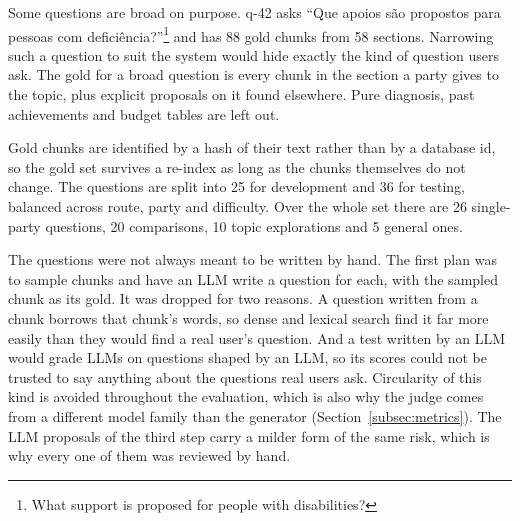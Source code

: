 Some questions are broad on purpose. q-42 asks ``Que apoios são propostos
para pessoas com deficiência?''\footnote{What support is proposed for people
with disabilities?} and has 88 gold chunks from 58 sections. Narrowing such a
question to suit the system would hide exactly the kind of question users ask.
The gold for a broad question is every chunk in the section a party gives to
the topic, plus explicit proposals on it found elsewhere. Pure diagnosis, past
achievements and budget tables are left out.

Gold chunks are identified by a hash of their text rather than by a database
id, so the gold set survives a re-index as long as the chunks themselves do not
change. The questions are split into 25 for development and 36 for testing,
balanced across route, party and difficulty. Over the whole set there are 26
single-party questions, 20 comparisons, 10 topic explorations and 5 general
ones.

The questions were not always meant to be written by hand. The first plan was
to sample chunks and have an LLM write a question for each, with the sampled
chunk as its gold. It was dropped for two reasons. A question written from a
chunk borrows that chunk's words, so dense and lexical search find it far more
easily than they would find a real user's question. And a test written by an
LLM would grade LLMs on questions shaped by an LLM, so its scores could not be
trusted to say anything about the questions real users ask. Circularity of
this kind is avoided throughout the evaluation, which is also why the judge
comes from a different model family than the generator
(Section~\ref{subsec:metrics}). The LLM proposals of the third step carry a
milder form of the same risk, which is why every one of them was reviewed by
hand.

